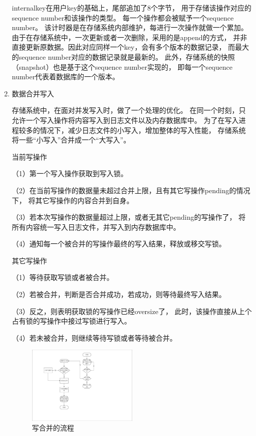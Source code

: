 \begin{enumerate}
		internalkey在用户key的基础上，尾部追加了8个字节，
		用于存储该操作对应的sequence number和该操作的类型。
		每一个操作都会被赋予一个sequence number。
		该计时器是在存储系统内部维护，每进行一次操作就做一个累加。
		由于在存储系统中，一次更新或者一次删除，采用的是append的方式，
		并非直接更新原数据。因此对应同样一个key，会有多个版本的数据记录，
		而最大的sequence number对应的数据记录就是最新的。
		此外，存储系统的快照（snapshot）也是基于这个sequence number实现的，
		即每一个sequence number代表着数据库的一个版本。

		\item 数据合并写入
		
		存储系统中，在面对并发写入时，做了一个处理的优化。
		在同一个时刻，只允许一个写入操作将内容写入到日志文件以及内存数据库中。
		为了在写入进程较多的情况下，减少日志文件的小写入，增加整体的写入性能，
		存储系统将一些“小写入”合并成一个“大写入”。

		当前写操作

		（1）第一个写入操作获取到写入锁。
		
		（2）在当前写操作的数据量未超过合并上限，且有其它写操作pending的情况下，
		将其它写操作的内容合并到自身。
		
		（3）若本次写操作的数据量超过上限，或者无其它pending的写操作了，
		将所有内容统一写入日志文件，并写入到内存数据库中。
		
		（4）通知每一个被合并的写操作最终的写入结果，释放或移交写锁。

		其它写操作

		（1）等待获取写锁或者被合并。
		
		（2）若被合并，判断是否合并成功，若成功，则等待最终写入结果。

		（3）反之，则表明获取锁的写操作已经oversize了，
		此时，该操作直接从上个占有锁的写操作中接过写锁进行写入。
		
		（4）若未被合并，则继续等待写锁或者等待被合并。

		\begin{figure}[H]
			\centering
			\includegraphics[width=0.50\textwidth]{pdf/write_merge.pdf}
			\caption{写合并的流程}
			\label{write_merge}
		\end{figure}


\end{enumerate}
